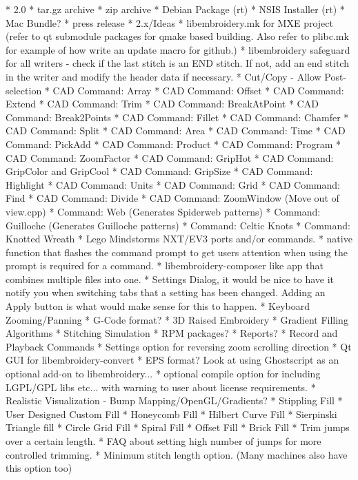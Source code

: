 \documentclass[a4paper]{report}
\begin{document}
{* 2.0
  * tar.gz archive
  * zip archive
  * Debian Package (rt)
  * NSIS Installer (rt)
  * Mac Bundle?
  * press release
* 2.x/Ideas
  * libembroidery.mk for MXE project (refer to qt submodule packages for qmake based building. Also refer to plibc.mk for example of how write an update macro for github.)
  * libembroidery safeguard for all writers - check if the last stitch is an END stitch. If not, add an end stitch in the writer and modify the header data if necessary.
  * Cut/Copy - Allow Post-selection
  * CAD Command: Array
  * CAD Command: Offset
  * CAD Command: Extend
  * CAD Command: Trim
  * CAD Command: BreakAtPoint
  * CAD Command: Break2Points
  * CAD Command: Fillet
  * CAD Command: Chamfer
  * CAD Command: Split
  * CAD Command: Area
  * CAD Command: Time
  * CAD Command: PickAdd
  * CAD Command: Product
  * CAD Command: Program
  * CAD Command: ZoomFactor
  * CAD Command: GripHot
  * CAD Command: GripColor and GripCool
  * CAD Command: GripSize
  * CAD Command: Highlight
  * CAD Command: Units
  * CAD Command: Grid
  * CAD Command: Find
  * CAD Command: Divide
  * CAD Command: ZoomWindow (Move out of view.cpp)
  * Command: Web (Generates Spiderweb patterns)
  * Command: Guilloche (Generates Guilloche patterns)
  * Command: Celtic Knots
  * Command: Knotted Wreath
  * Lego Mindstorms NXT/EV3 ports and/or commands.
  * native function that flashes the command prompt to get users attention when using the prompt is required for a command.
  * libembroidery-composer like app that combines multiple files into one.
  * Settings Dialog, it would be nice to have it notify you when switching tabs that a setting has been changed. Adding an Apply button is what would make sense for this to happen.
  * Keyboard Zooming/Panning
  * G-Code format?
  * 3D Raised Embroidery
  * Gradient Filling Algorithms
  * Stitching Simulation
  * RPM packages?
  * Reports?
  * Record and Playback Commands
  * Settings option for reversing zoom scrolling direction
  * Qt GUI for libembroidery-convert
  * EPS format? Look at using Ghostscript as an optional add-on to libembroidery...
  * optional compile option for including LGPL/GPL libs etc... with warning to user about license requirements.
  * Realistic Visualization - Bump Mapping/OpenGL/Gradients?
  * Stippling Fill
  * User Designed Custom Fill
  * Honeycomb Fill
  * Hilbert Curve Fill
  * Sierpinski Triangle fill
  * Circle Grid Fill
  * Spiral Fill
  * Offset Fill
  * Brick Fill
  * Trim jumps over a certain length.
  * FAQ about setting high number of jumps for more controlled trimming.
  * Minimum stitch length option. (Many machines also have this option too)
}
\end{document}
